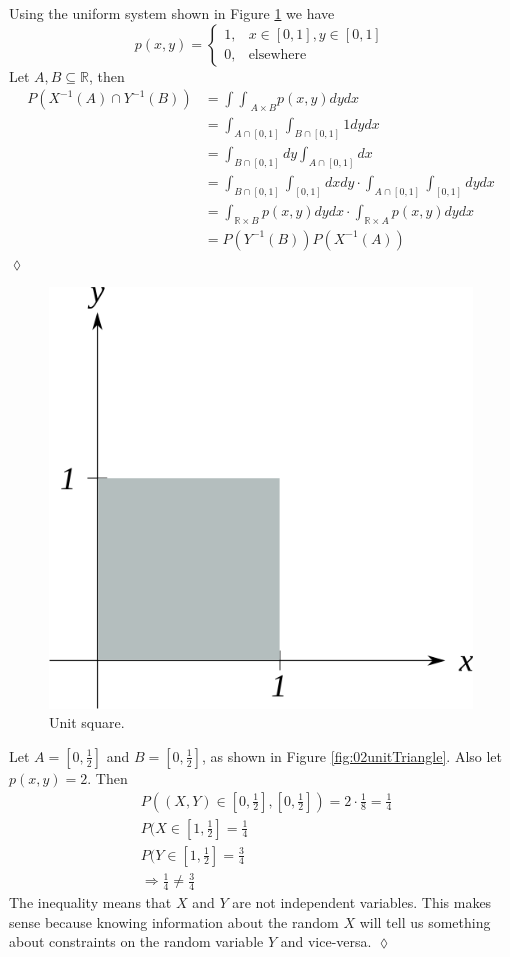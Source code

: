 \begin{example}
Using the uniform system shown in Figure \ref{fig:02unitSquare} we have
$$p(x,y) = \begin{cases} 1, & x\in[0,1],y\in[0,1] \\ 0, & \text{elsewhere} \end{cases}$$
Let $A,B\subseteq\mathbb{R}$, then
\begin{align*}
P(X^{-1}(A) \cap Y^{-1}(B)) &= {\int\int}_{A\times B} p(x,y)dydx \\
&= \int_{A\cap[0,1]}\int_{B\cap[0,1]} 1 dydx \\
&= \int_{B\cap[0,1]}dy \int_{A\cap[0,1]}dx \\
&= \int_{B\cap[0,1]}\int_{[0,1]}dxdy \cdot \int_{A\cap[0,1]}\int_{[0,1]}dydx \\
&= \int_{\mathbb{R}\times B}p(x,y)dydx \cdot \int_{\mathbb{R}\times A}p(x,y)dydx \\
&= P(Y^{-1}(B)) P(X^{-1}(A))
\end{align*}
$\lozenge$
\end{example}

\begin{figure}[ht!]
	\centering
	\includegraphics[width=.3\textwidth]{images/02unitSquare}
	\caption{Unit square.}
	\label{fig:02unitSquare}
\end{figure}

\begin{example}
Let $A=[0,\frac{1}{2}]$ and $B=[0,\frac{1}{2}]$, as shown in Figure \ref{fig:02unitTriangle}. Also let $p(x,y)=2$. Then
\begin{align*}
&P((X,Y)\in [0,\frac{1}{2}],[0,\frac{1}{2}]) = 2\cdot \frac{1}{8} = \frac{1}{4} \\
&P(X\in[1,\frac{1}{2}] = \frac{1}{4} \\
&P(Y\in[1,\frac{1}{2}] = \frac{3}{4} \\
&\Rightarrow \frac{1}{4} \neq \frac{3}{4}
\end{align*}
The inequality means that $X$ and $Y$ are not independent variables. This makes sense because knowing information about the random $X$ will tell us something about constraints on the random variable $Y$ and vice-versa.
$\lozenge$
\end{example}


